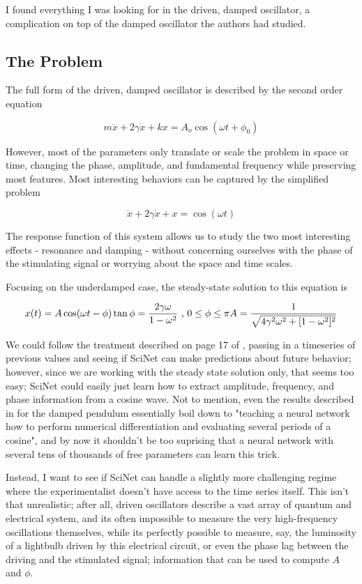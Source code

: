 \documentclass[aps,prl,preprint,groupedaddress]{revtex4-1}
\begin{document}
I found everything I was looking for in the driven, damped oscillator, a complication on top of the damped oscillator the authors had studied. 

\subsection{ The Problem}

The full form of the driven, damped oscillator is described by the second order equation

$$ m\ddot{x} + 2\gamma \dot{x} + k x = A_o \cos \left( \omega t + \phi_0 \right) $$

However, most of the parameters only translate or scale the problem in space or time, changing the phase, amplitude, and fundamental frequency while preserving most features. Most interesting behaviors can be captured by the simplified problem

$$ \ddot{x} + 2\gamma \dot{x} + x = \cos (\omega t )$$

The response function of this system allows us to study the two most interesting effects - resonance and damping - without concerning ourselves with the phase of the stimulating signal or worrying about the space and time scales.

Focusing on the underdamped case, the steady-state solution to this equation is

$$
x(t) = A \cos (\omega t - \phi ) \\
\tan{\phi} = \frac{2\gamma \omega}{1 - \omega^2} \text{ , } 0 \le \phi \le \pi \\
A = \frac{1}{\sqrt{4\gamma^2\omega^2 + [1 - \omega^2]^2}}
$$

We could follow the treatment described on page 17 of \cite{iten2020supplement}, passing in a timeseries of previous values and seeing if SciNet can make predictions about future behavior; however, since we are working with the steady state solution only, that seems too easy; SciNet could easily just learn how to extract amplitude, frequency, and phase information from a cosine wave. Not to mention, even the results described in \cite{iten2020} for the damped pendulum essentially boil down to "teaching a neural network how to perform numerical differentiation and evaluating several periods of a cosine", and by now it shouldn't be too suprising that a neural network with several tens of thousands of free parameters can learn this trick.

Instead, I want to see if SciNet can handle a slightly more challenging regime where the experimentalist doesn't have access to the time series itself. This isn't that unrealistic; after all, driven oscillators describe a vast array of quantum and electrical system, and its often impossible to measure the very high-frequency oscillations themselves, while its perfectly possible to measure, say, the luminosity of a lightbulb driven by this electrical circuit, or even the phase lag between the driving and the stimulated signal; information that can be used to compute $A$ and $\phi$.
\end{document}

